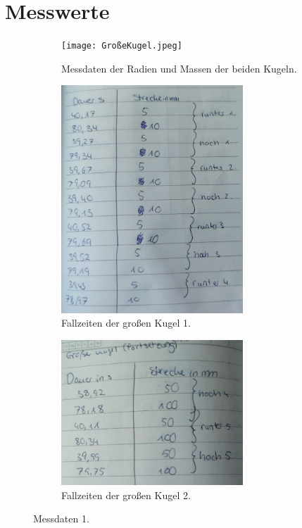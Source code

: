 \section{Messwerte}
\label{sec:Messwerte}
\begin{figure}[h]
  \centering
  \begin{subfigure}{0.5\textwidth}
    \centering
    \texttt{[image: GroßeKugel.jpeg]}
    \caption{Messdaten der Radien und Massen der beiden Kugeln.}
  \end{subfigure}

  \begin{subfigure}{0.5\textwidth}
    \centering
    \includegraphics[width=0.75\textwidth]{GrKugel1.jpeg}
    \caption{Fallzeiten der großen Kugel 1.}
  \end{subfigure}

  \begin{subfigure}{0.5\textwidth}
    \centering
    \includegraphics[width=0.75\textwidth]{GrKugel2.jpeg}
    \caption{Fallzeiten der großen Kugel 2.}
  \end{subfigure}
  \caption{Messdaten 1.}
\end{figure}

